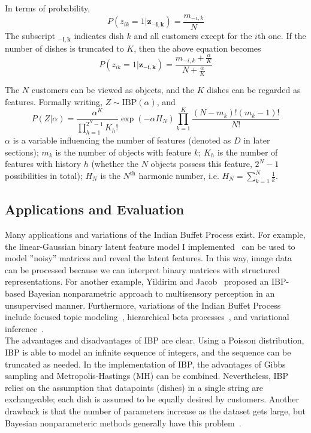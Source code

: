 In terms of probability, 
\begin{equation}
P(z_{ik}=1 | \mathbf{z_{-i,k}}) = \displaystyle \frac{m_{-i,k}}{N}
\end{equation}
The subscript $\mathbf{_{-i,k}}$ indicates dish $k$ and all customers except for the $i$th one. If the number of dishes is truncated to $K$, then the above equation becomes
\begin{equation}
P(z_{ik}=1 | \mathbf{z_{-i,k}}) = \displaystyle \frac{m_{-i,k} + \frac{\alpha}{K}}{N + \frac{\alpha}{K}}
\end{equation}

The $N$ customers can be viewed as objects, and the $K$ dishes can be regarded as features. Formally writing, $Z \sim \text{IBP}(\alpha)$, and
\begin{equation}
P(Z | \alpha) = \dfrac{\alpha^K}{\prod^{2^N-1}_{h=1}K_h!} \exp(-\alpha H_N) \prod^{K}_{k=1}\dfrac{(N-m_k)!(m_k-1)!}{N!}
\end{equation}
$\alpha$ is a variable influencing the number of features (denoted as $D$ in later sections); $m_k$ is the number of objects with feature $k$; $K_h$ is the number of features with history $h$ (whether the $N$ objects possess this feature, $2^N-1$ possibilities in total); $H_N$ is the $N^{\text{th}}$ harmonic number, i.e. $H_N = \sum^{N}_{k=1}\frac{1}{k}$.

\subsection{Applications and Evaluation}
Many applications and variations of the Indian Buffet Process exist. For example, the linear-Gaussian binary latent feature model I implemented~\cite{ibp2012matlab} can be used to model ''noisy'' matrices and reveal the latent features. In this way, image data can be processed because we can interpret binary matrices with structured representations. For another example, Yildirim and Jacob~\cite{yildirimbayesian} proposed an IBP-based Bayesian nonparametric approach to multisensory perception in an unsupervised manner. Furthermore, variations of the Indian Buffet Process include focused topic modeling~\cite{williamson2009focused}, hierarchical beta processes~\cite{williamson2009focused}, and variational inference~\cite{doshi2008variational}. \\

The advantages and disadvantages of IBP are clear. Using a Poisson distribution, IBP is able to model an infinite sequence of integers, and the sequence can be truncated as needed. In the implementation of IBP, the advantages of Gibbs sampling and Metropolis-Hastings (MH) can be combined. Nevertheless, IBP relies on the assumption that datapoints (dishes) in a single string are exchangeable; each dish is assumed to be equally desired by customers. Another drawback is that the number of parameters increase as the dataset gets large, but Bayesian nonparameteric methods generally have this problem~\cite{ibp2012matlab}.
